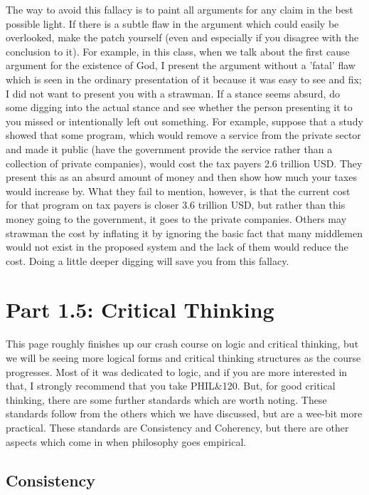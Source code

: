 The way to avoid this fallacy is to paint all arguments for any claim in the best possible light. If there is a subtle flaw in the argument which could easily be overlooked, make the patch yourself (even and especially if you disagree with the conclusion to it). For example, in this class, when we talk about the first cause argument for the existence of God, I present the argument without a 'fatal' flaw which is seen in the ordinary presentation of it because it was easy to see and fix; I did not want to present you with a strawman.  If a stance seems absurd, do some digging into the actual stance and see whether the person presenting it to you missed or intentionally left out something. For example, suppose that a study showed that some program, which would remove a service from the private sector and made it public (have the government provide the service rather than a collection of private companies), would cost the tax payers 2.6 trillion USD. They present this as an absurd amount of money and then show how much your taxes would increase by. What they fail to mention, however, is that the current cost for that program on tax payers is closer 3.6 trillion USD, but rather than this money going to the government, it goes to the private companies. Others may strawman the cost by inflating it by ignoring the basic fact that many middlemen would not exist in the proposed system and the lack of them would reduce the cost. Doing a little deeper digging will save you from this fallacy. 

\section{Part 1.5: Critical Thinking}

This page roughly finishes up our crash course on logic and critical thinking, but we will be seeing more logical forms and critical thinking structures as the course progresses. Most of it was dedicated to logic, and if you are more interested in that, I strongly recommend that you take PHIL\&120. But, for good critical thinking, there are some further standards which are worth noting. These standards follow from the others which we have discussed, but are a wee-bit more practical. These standards are Consistency and Coherency, but there are other aspects which come in when philosophy goes empirical.

\subsection{Consistency}


